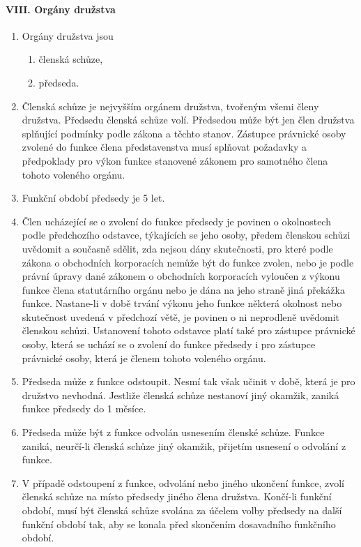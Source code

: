\paragraph{VIII. Orgány družstva}
\begin{enumerate}
    \item Orgány družstva jsou
    \begin{enumerate}[label=\alph*.]
        \item členská schůze,
        \item předseda.
    \end{enumerate}
    \item Členská schůze je nejvyšším orgánem družstva, tvořeným všemi členy družstva. Předsedu členská schůze volí. Předsedou může být jen člen družstva splňující podmínky podle zákona a těchto stanov. Zástupce právnické osoby zvolené do funkce člena představenstva musí splňovat požadavky a předpoklady pro výkon funkce stanovené zákonem pro samotného člena tohoto voleného orgánu.
    \item Funkční období předsedy je 5 let.
    \item Člen ucházející se o zvolení do funkce předsedy je povinen o okolnostech podle předchozího odstavce, týkajících se jeho osoby, předem členskou schůzi uvědomit a současně sdělit, zda nejsou dány skutečnosti, pro které podle zákona o obchodních korporacích nemůže být do funkce zvolen, nebo je podle právní úpravy dané zákonem o obchodních korporacích vyloučen z výkonu funkce člena statutárního orgánu nebo je dána na jeho straně jiná překážka funkce. Nastane-li v době trvání výkonu jeho funkce některá okolnost nebo skutečnost uvedená v předchozí větě, je povinen o ni neprodleně uvědomit členskou schůzi. Ustanovení tohoto odstavce platí také pro zástupce právnické osoby, která se uchází se o zvolení do funkce předsedy i pro zástupce právnické osoby, která je členem tohoto voleného orgánu.
    \item Předseda může z funkce odstoupit. Nesmí tak však učinit v době, která je pro družstvo nevhodná. Jestliže členská schůze nestanoví jiný okamžik, zaniká funkce předsedy do 1 měsíce.
    \item Předseda může být z funkce odvolán usnesením členské schůze. Funkce zaniká, neurčí-li členská schůze jiný okamžik, přijetím usnesení o odvolání z funkce.
    \item V případě odstoupení z funkce, odvolání nebo jiného ukončení funkce, zvolí členská schůze na místo předsedy jiného člena družstva. Končí-li funkční období, musí být členská schůze svolána za účelem volby předsedy na další funkční období tak, aby se konala před skončením dosavadního funkčního období.
\end{enumerate}

